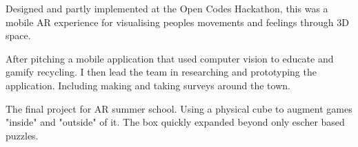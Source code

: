 \documentclass[a4paper]{deedy-resume-twopage} %
\begin{document}
\begin{minipage}[t]{0.66\textwidth}
  Designed and partly implemented at the Open Codes Hackathon, this was a mobile AR experience for visualising peoples movements and feelings through 3D space.

  \sectionspace %


  After pitching a mobile application that used computer vision to educate and gamify recycling. %
  I then lead the team in researching and prototyping the application.
  Including making and taking surveys around the town. %

  \sectionspace %



  The final project for AR summer school. Using a physical cube to augment games "inside" and "outside" of it. The box quickly expanded beyond only escher based puzzles.%


\end{minipage}
\end{document}
